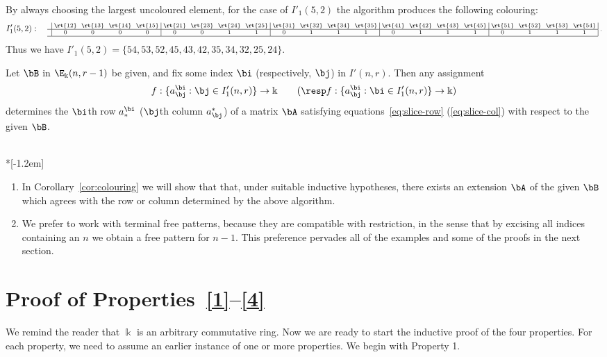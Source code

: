 \begin{exam}
By always choosing the largest uncoloured element, for the case of
$I'_1(5,2)$ the algorithm produces the following colouring:
\[
 I'_1(5,2): \quad
\text{\setlength{\arraycolsep}{2.7pt}\scriptsize
$\displaystyle \begin{array}{c|cccc|cccc|cccc|cccc|cccc|}
 &\rt{12}&\rt{13}&\rt{14}&\rt{15}&\rt{21} &\rt{23}&\rt{24}&\rt{25}
 &\rt{31}&\rt{32} &\rt{34}&\rt{35}&\rt{41}&\rt{42}&\rt{43} &\rt{45} 
 &\rt{51}&\rt{52}&\rt{53} &\rt{54} \\ \hline
 &0&0&0&0	&0&0&1&1	 &0&1&1&1	&0&1&1&1 &0&1&1&1
 \\ 
 \hline
\end{array}\; .$}
\]
Thus we have $I'_1(5,2) = \{54, 53, 52, 45, 43, 42, 35, 34, 32, 25, 24\}$.
\end{exam}

Let $\bB$ in $\E_\Bbbk(n,r-1)$ be given, and fix some index $\bi$
(respectively, $\bj$) in $I'(n,r)$. Then any assignment
 \[
 f: \{ a^\bi_\bj : \bj \in I'_1(n,r)\} \to \Bbbk \qquad (\resp f: \{
 a^\bi_\bj : \bi \in I'_1(n,r)\} \to \Bbbk )
 \]
determines the $\bi$th row $a^\bi_*$ (\resp $\bj$th column $a^*_\bj$)
of a matrix $\bA$ satisfying equations~\eqref{eq:slice-row} (\resp \eqref{eq:slice-col}) with respect to the given $\bB$.


\goodbreak
\begin{rema}\label{rmk:promise}\ \\*[-1.2em]
\begin{enumerate}[label=(\roman*)]
\item\label{rema5.6_i} In Corollary~\ref{cor:colouring} we will show that that, under
suitable inductive hypotheses, there exists an extension $\bA$ of the
given $\bB$ which agrees with the row or column determined by the
above algorithm.

\item\label{rema5.6_ii} We prefer to work with terminal free patterns, because they are
compatible with restriction, in the sense that by excising all indices
containing an $n$ we obtain a free pattern for $n-1$. This preference
pervades all of the examples and some of the proofs in the next
section.
\end{enumerate}
\end{rema}



\section{Proof of Properties~\texorpdfstring{\ref{1}--\ref{4}}{1--4}}\label{sec:proof}
We remind the reader that $\Bbbk$ is an arbitrary commutative
ring. Now we are ready to start the inductive proof of the four
properties. For each property, we need to assume an earlier instance
of one or more properties. We begin with Property 1.


